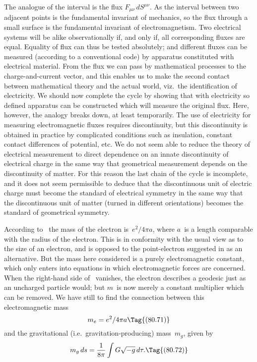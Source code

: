 \documentclass[12pt]{book}
\begin{document}
The analogue of the interval is the flux $F_{\mu\nu}\, dS^{\mu\nu}$. As the interval between
%
two adjacent points is the fundamental invariant of mechanics, so the flux
through a small surface is the fundamental invariant of electromagnetism.
Two electrical systems will be alike observationally if, and only if, all corresponding
fluxes are equal. Equality of flux can thus be tested absolutely; and
different fluxes can be measured (according to a conventional code) by apparatus
constituted with electrical material. From the flux we can pass by mathematical
processes to the charge-and-current vector, and this enables us to make
the second contact between mathematical theory and the actual world, viz.\ the
identification of electricity. We should now complete the cycle by showing
that with electricity so defined apparatus can be constructed which will measure
the original flux. Here, however, the analogy breaks down, at least temporarily.
The use of electricity for measuring electromagnetic fluxes requires discontinuity,
but this discontinuity is obtained in practice by complicated conditions
such as insulation, constant contact differences of potential, etc. We do not
seem able to reduce the theory of electrical measurement to direct dependence
on an innate discontinuity of electrical charge in the same way that geometrical
measurement depends on the discontinuity of matter. For this reason the last
chain of the cycle is incomplete, and it does not seem permissible to deduce
that the discontinuous unit of electric charge must become the standard of
electrical symmetry in the same way that the discontinuous unit of matter
(turned in different orientations) becomes the standard of geometrical symmetry.

According to~ the mass of the electron is~$e^{2}/4\pi a$, where $a$~is a length
comparable with the radius of the electron. This is in conformity with the
usual view as to the size of an electron, and is opposed to the point-electron
suggested in  as an alternative. But the mass here considered is a purely
electromagnetic constant, which only enters into equations in which electromagnetic
forces are concerned. When the right-hand side of~ vanishes,
the electron describes a geodesic just as an uncharged particle would; but
$m$~is now merely a constant multiplier which can be removed. We have still to
find the connection between this electromagnetic mass
%
\[
m_{e} = e^{2}/4\pi a
\Tag{(80.71)}
\]
and the gravitational (i.e.\ gravitation-producing) mass~$m_{g}$, given by
\[
m_{g}\, ds = \frac{1}{8\pi} \int G\sqrt{-g}\, d\tau.
\Tag{(80.72)}
\]
\end{document}
